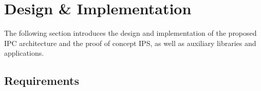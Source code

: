 %
%
\chapter{Design \& Implementation}
\label{sec:design}

The following section introduces the design and implementation of the proposed \ac{IPC} architecture and the proof of concept \ac{IPS}, as well as auxiliary libraries and applications.

\section{Requirements}

